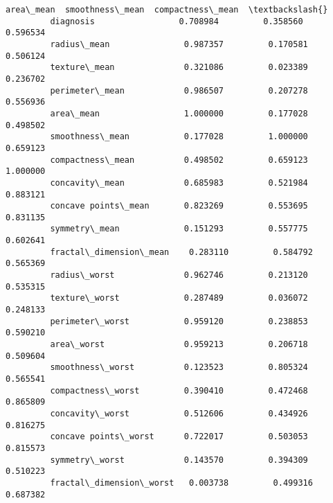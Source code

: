 \documentclass[11pt]{article}
\begin{document}
\begin{Verbatim}[commandchars=\\\{\}]
                                  area\_mean  smoothness\_mean  compactness\_mean  \textbackslash{}
         diagnosis                 0.708984         0.358560          0.596534   
         radius\_mean               0.987357         0.170581          0.506124   
         texture\_mean              0.321086         0.023389          0.236702   
         perimeter\_mean            0.986507         0.207278          0.556936   
         area\_mean                 1.000000         0.177028          0.498502   
         smoothness\_mean           0.177028         1.000000          0.659123   
         compactness\_mean          0.498502         0.659123          1.000000   
         concavity\_mean            0.685983         0.521984          0.883121   
         concave points\_mean       0.823269         0.553695          0.831135   
         symmetry\_mean             0.151293         0.557775          0.602641   
         fractal\_dimension\_mean    0.283110         0.584792          0.565369   
         radius\_worst              0.962746         0.213120          0.535315   
         texture\_worst             0.287489         0.036072          0.248133   
         perimeter\_worst           0.959120         0.238853          0.590210   
         area\_worst                0.959213         0.206718          0.509604   
         smoothness\_worst          0.123523         0.805324          0.565541   
         compactness\_worst         0.390410         0.472468          0.865809   
         concavity\_worst           0.512606         0.434926          0.816275   
         concave points\_worst      0.722017         0.503053          0.815573   
         symmetry\_worst            0.143570         0.394309          0.510223   
         fractal\_dimension\_worst   0.003738         0.499316          0.687382   
         

\end{Verbatim}
\end{document}
